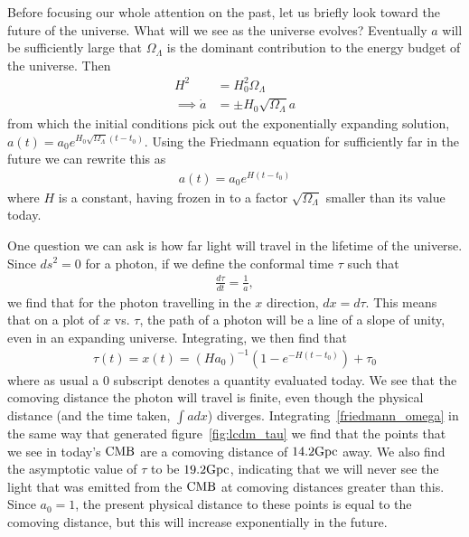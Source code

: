     Before focusing our whole attention on the past, let us briefly
    look toward the future of the universe.
    What will we see as the universe evolves?
    Eventually $a$ will be
    sufficiently large that $\Omega_{\Lambda}$
    is the dominant contribution to the energy budget of the universe.
    Then
    \begin{align}
        H^2 &= H_0^2\Omega_{\Lambda}\\
        \implies \dot{a} &= \pm H_0\sqrt{\Omega_{\Lambda}}a
    \end{align}
    from which the initial conditions pick out the exponentially expanding solution,\\
    ${a(t)=a_0e^{H_0\sqrt{\Omega_{\Lambda}}\left(t-t_0\right)}}$. Using the Friedmann equation
    for sufficiently far in the future we can rewrite this as
    \begin{align}
        a(t)=a_0e^{H\left(t-t_0\right)}
    \end{align}
    where $H$ is a constant, having frozen in to a factor $\sqrt{\Omega_{\Lambda}}$ smaller than
    its value today.


    One question we can ask is how far light will travel in the lifetime of the universe.
    Since $ds^2=0$ for a photon, if we define the conformal time $\tau$ such that
    \begin{align}\label{conformal_time_defn}
        \frac{d\tau}{dt} = \frac{1}{a},
    \end{align}
    we find that for the photon travelling in the $x$ direction, $dx=d\tau$.
    This means that on a plot of $x$ vs. $\tau$, the path of a photon
    will be a line of a slope of unity, even in an expanding universe.
    Integrating, we then find that
    \begin{align}
        \tau(t)=x(t)=(Ha_0)^{-1}\left(1-e^{-H(t-t_0)}\right)+\tau_0
    \end{align}
    where as usual a $0$ subscript denotes a quantity evaluated today.
    We see that the comoving distance the photon will travel is finite, even though the physical
    distance (and the time taken, $\int a dx$) diverges.
    Integrating~\eqref{friedmann_omega} in the same way that generated figure~\ref{fig:lcdm_tau}
    we find that the points that we see in today's $\text{CMB}$ are a comoving distance of $14.2\text{Gpc}$ away.
    We also find the asymptotic value of $\tau$ to be $19.2\text{Gpc}$, indicating that we will never see the
    light that was emitted from the $\text{CMB}$ at comoving distances greater than this.
    Since $a_0=1$, the present physical distance to these points is equal to the comoving distance,
    but this will increase exponentially in the future.

